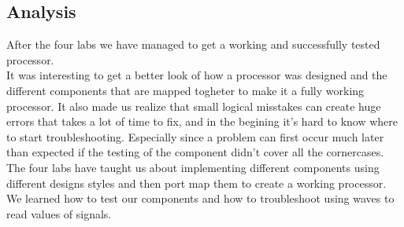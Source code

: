 \documentclass[a4paper]{article}
\begin{document}
\subsection{Analysis}

After the four labs we have managed to get a working and successfully tested processor.\\
It was interesting to get a better look of how a processor was designed and the different components that are mapped togheter to make it a fully working processor.
It also made us realize that small logical misstakes can create huge errors that takes a lot of time to fix, and in the begining it's hard to know where to start troubleshooting. Especially since a problem can first occur much later than expected if the testing of the component didn't cover all the cornercases.\\
The four labs have taught us about implementing different components using different designs styles and then port map them to create a working processor. We learned how to test our components and how to troubleshoot using waves to read values of signals.
\end{document}
